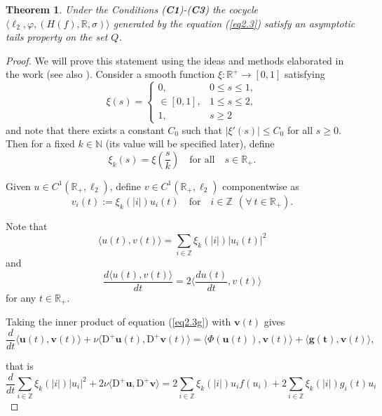 \documentclass{amsart}%
\newtheorem{theorem}[lemma]{Theorem}
\begin{document}
\begin{theorem}\label{thAC1} Under the Conditions
(\textbf{C1})-(\textbf{C3}) the cocycle $\langle
\ell_{2},\varphi,(H(f),\mathbb R,\sigma)\rangle$ generated by the
equation (\ref{eq2.3}) satisfy an asymptotic tails property on the
set $Q$.
\end{theorem}
\begin{proof}
We will prove this statement using the ideas and methods
elaborated in the work \cite{BLW_2001} (see also
\cite[Ch.2.3]{HK_2023}). Consider a smooth function \( \xi :
\mathbb{R}^+ \to [0, 1] \) satisfying
\[
\xi(s) =
\begin{cases}
0, & 0 \le s \le 1, \\
\in [0, 1], & 1 \le s \le 2, \\
1, & s \ge 2
\end{cases}
\]
and note that there exists a constant $C_0$ such that
$|\xi'(s)| \le C_0$ for all \( s \ge 0 \). Then for a fixed \( k
\in \mathbb{N} \) (its value will be specified later), define
\[
\xi_k(s) = \xi \left( \frac{s}{k} \right) \quad \text{for all} \quad s \in \mathbb{R_+}.
\]

Given \( u \in C^{1}(\mathbb R_{+},\ell_{2}) \), define \( v \in
C^{1}(\mathbb R_{+},\ell_{2}) \) componentwise as
\[
v_i (t):= \xi_k( |i| ) u_i(t) \quad \text{for} \quad i \in
\mathbb{Z}\ \ (\forall \ t\in \mathbb R_{+}).
\]

Note that
\begin{equation}\label{eqNT1}
\langle u(t),v(t)\rangle =\sum\limits_{i\in \mathbb
Z}\xi_{k}(|i|)|u_{i}(t)|^{2}
\end{equation}
and
\begin{equation}\label{eqNT2}
\frac{d\langle u(t),v(t)\rangle}{dt}=2\langle
\frac{du(t)}{dt},v(t)\rangle
\end{equation}
for any $t\in \mathbb R_{+}$.

Taking the inner product of equation (\ref{eq2.3g}) with \(
\mathbf{v}(t) \) gives
\[
\frac{d}{dt} \langle \mathbf{u}(t), \mathbf{v}(t) \rangle + \nu
\langle \mathrm{D}^+ \mathbf{u}(t), \mathrm{D}^+ \mathbf{v}(t)
\rangle = \langle \Phi(\mathbf{u}(t)), \mathbf{v}(t) \rangle +
\langle \mathbf{g(t)}, \mathbf{v}(t) \rangle,
\]

that is
\begin{equation}\label{20}
\frac{d}{dt} \sum_{i \in \mathbb{Z}} \xi_k( |i| ) |u_i|^2 + 2 \nu
\langle \mathrm{D}^+ \mathbf{u}, \mathrm{D}^+ \mathbf{v} \rangle =
2 \sum_{i \in \mathbb{Z}} \xi_k( |i| ) u_i f(u_i) + 2 \sum_{i \in
\mathbb{Z}} \xi_k( |i| ) g_{i}(t)u_i
\end{equation}


\end{proof}
\end{document}
